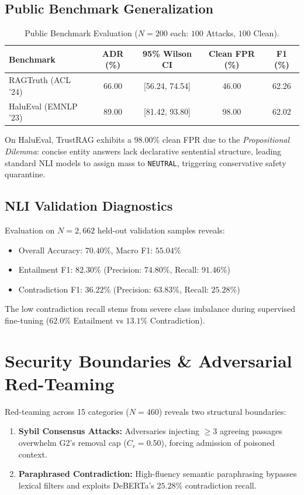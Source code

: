 \documentclass[11pt,a4paper]{article}
\begin{document}
\subsection{Public Benchmark Generalization}
\begin{table}[h]
\centering
\small
\caption{Public Benchmark Evaluation ($N=200$ each: $100$ Attacks, $100$ Clean).}
\label{tab:public}
\begin{tabular}{lcccc}
\toprule
\textbf{Benchmark} & \textbf{ADR (\%)} & \textbf{95\% Wilson CI} & \textbf{Clean FPR (\%)} & \textbf{F1 (\%)} \\
\midrule
RAGTruth (ACL '24) & 66.00 & [56.24, 74.54] & 46.00 & 62.26 \\
HaluEval (EMNLP '23) & 89.00 & [81.42, 93.80] & 98.00 & 62.02 \\
\bottomrule
\end{tabular}
\end{table}

On HaluEval, TrustRAG exhibits a $98.00\%$ clean FPR due to the \textit{Propositional Dilemma}: concise entity answers lack declarative sentential structure, leading standard NLI models to assign mass to \texttt{NEUTRAL}, triggering conservative safety quarantine.

\subsection{NLI Validation Diagnostics}
Evaluation on $N=2,662$ held-out validation samples reveals:
\begin{itemize}
    \item Overall Accuracy: $70.40\%$, Macro F1: $55.04\%$
    \item Entailment F1: $82.30\%$ (Precision: $74.80\%$, Recall: $91.46\%$)
    \item Contradiction F1: $36.22\%$ (Precision: $63.83\%$, Recall: $25.28\%$)
\end{itemize}
The low contradiction recall stems from severe class imbalance during supervised fine-tuning ($62.0\%$ Entailment vs $13.1\%$ Contradiction).

\section{Security Boundaries \& Adversarial Red-Teaming}
Red-teaming across 15 categories ($N=460$) reveals two structural boundaries:
\begin{enumerate}
    \item \textbf{Sybil Consensus Attacks:} Adversaries injecting $\ge 3$ agreeing passages overwhelm G2's removal cap ($C_r = 0.50$), forcing admission of poisoned context.
    \item \textbf{Paraphrased Contradiction:} High-fluency semantic paraphrasing bypasses lexical filters and exploits DeBERTa's $25.28\%$ contradiction recall.
\end{enumerate}
\end{document}
